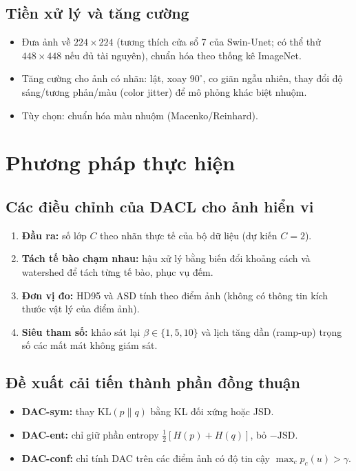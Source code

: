 \documentclass[12pt,a4paper]{article}
\begin{document}
\subsection{Tiền xử lý và tăng cường}
\begin{itemize}
  \item Đưa ảnh về $224\times224$ (tương thích cửa sổ 7 của Swin-Unet; có thể thử
        $448\times448$ nếu đủ tài nguyên), chuẩn hóa theo thống kê ImageNet.
  \item Tăng cường cho ảnh có nhãn: lật, xoay $90^\circ$, co giãn ngẫu nhiên, thay đổi
        độ sáng/tương phản/màu (color jitter) để mô phỏng khác biệt nhuộm.
  \item Tùy chọn: chuẩn hóa màu nhuộm (Macenko/Reinhard).
\end{itemize}

\section{Phương pháp thực hiện}

\subsection{Các điều chỉnh của DACL cho ảnh hiển vi}
\begin{enumerate}
  \item \textbf{Đầu ra:} số lớp $C$ theo nhãn thực tế của bộ dữ liệu (dự kiến $C=2$).
  \item \textbf{Tách tế bào chạm nhau:} hậu xử lý bằng biến đổi khoảng cách và
        watershed để tách từng tế bào, phục vụ đếm.
  \item \textbf{Đơn vị đo:} HD95 và ASD tính theo điểm ảnh (không có thông tin
        kích thước vật lý của điểm ảnh).
  \item \textbf{Siêu tham số:} khảo sát lại $\beta\in\{1,5,10\}$ và lịch tăng dần
        (ramp-up) trọng số các mất mát không giám sát.
\end{enumerate}

\subsection{Đề xuất cải tiến thành phần đồng thuận}\label{sec:improve}
\begin{itemize}
  \item \textbf{DAC-sym:} thay $\mathrm{KL}(p\|q)$ bằng KL đối xứng hoặc JSD.
  \item \textbf{DAC-ent:} chỉ giữ phần entropy $\tfrac12[H(p)+H(q)]$, bỏ $-\mathrm{JSD}$.
  \item \textbf{DAC-conf:} chỉ tính DAC trên các điểm ảnh có độ tin cậy
        $\max_c p_c(u) > \gamma$.
\end{itemize}
\end{document}
